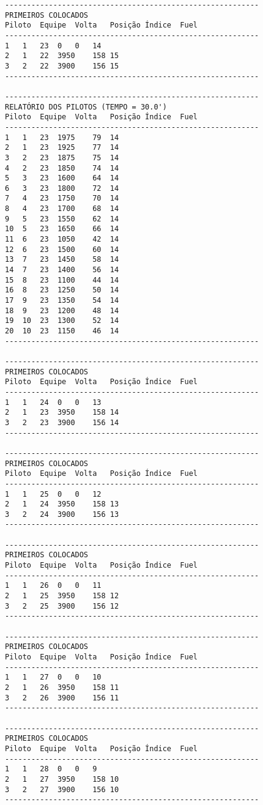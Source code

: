 \documentclass[12pt]{article}
\begin{document}
\begin{verbatim}
----------------------------------------------------------
PRIMEIROS COLOCADOS
Piloto	Equipe	Volta	Posição	Índice	Fuel
----------------------------------------------------------
1	1	23	0	0	14
2	1	22	3950	158	15
3	2	22	3900	156	15
----------------------------------------------------------

----------------------------------------------------------
RELATÓRIO DOS PILOTOS (TEMPO = 30.0')
Piloto	Equipe	Volta	Posição	Índice	Fuel
----------------------------------------------------------
1	1	23	1975	79	14
2	1	23	1925	77	14
3	2	23	1875	75	14
4	2	23	1850	74	14
5	3	23	1600	64	14
6	3	23	1800	72	14
7	4	23	1750	70	14
8	4	23	1700	68	14
9	5	23	1550	62	14
10	5	23	1650	66	14
11	6	23	1050	42	14
12	6	23	1500	60	14
13	7	23	1450	58	14
14	7	23	1400	56	14
15	8	23	1100	44	14
16	8	23	1250	50	14
17	9	23	1350	54	14
18	9	23	1200	48	14
19	10	23	1300	52	14
20	10	23	1150	46	14
----------------------------------------------------------

----------------------------------------------------------
PRIMEIROS COLOCADOS
Piloto	Equipe	Volta	Posição	Índice	Fuel
----------------------------------------------------------
1	1	24	0	0	13
2	1	23	3950	158	14
3	2	23	3900	156	14
----------------------------------------------------------

----------------------------------------------------------
PRIMEIROS COLOCADOS
Piloto	Equipe	Volta	Posição	Índice	Fuel
----------------------------------------------------------
1	1	25	0	0	12
2	1	24	3950	158	13
3	2	24	3900	156	13
----------------------------------------------------------

----------------------------------------------------------
PRIMEIROS COLOCADOS
Piloto	Equipe	Volta	Posição	Índice	Fuel
----------------------------------------------------------
1	1	26	0	0	11
2	1	25	3950	158	12
3	2	25	3900	156	12
----------------------------------------------------------

----------------------------------------------------------
PRIMEIROS COLOCADOS
Piloto	Equipe	Volta	Posição	Índice	Fuel
----------------------------------------------------------
1	1	27	0	0	10
2	1	26	3950	158	11
3	2	26	3900	156	11
----------------------------------------------------------

----------------------------------------------------------
PRIMEIROS COLOCADOS
Piloto	Equipe	Volta	Posição	Índice	Fuel
----------------------------------------------------------
1	1	28	0	0	9
2	1	27	3950	158	10
3	2	27	3900	156	10
----------------------------------------------------------


\end{verbatim}
\end{document}
